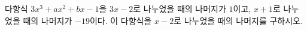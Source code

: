 다항식 $3x^3+ax^2+bx-1$을 $3x-2$로 나누었을 때의 나머지가 $1$이고, $x+1$로 나누었을 때의 나머지가 $-19$이다. 이 다항식을 $x-2$로 나누었을 때의 나머지를 구하시오. 
